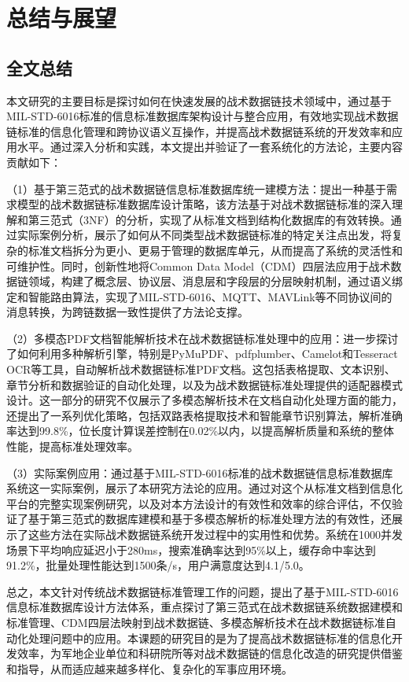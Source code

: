 \chapter{总结与展望}

\section{全文总结}

本文研究的主要目标是探讨如何在快速发展的战术数据链技术领域中，通过基于MIL-STD-6016标准的信息标准数据库架构设计与整合应用，有效地实现战术数据链标准的信息化管理和跨协议语义互操作，并提高战术数据链系统的开发效率和应用水平。通过深入分析和实践，本文提出并验证了一套系统化的方法论，主要内容贡献如下：

（1）基于第三范式的战术数据链信息标准数据库统一建模方法：提出一种基于需求模型的战术数据链标准数据库设计策略，该方法基于对战术数据链标准的深入理解和第三范式（3NF）的分析，实现了从标准文档到结构化数据库的有效转换。通过实际案例分析，展示了如何从不同类型战术数据链标准的特定关注点出发，将复杂的标准文档拆分为更小、更易于管理的数据库单元，从而提高了系统的灵活性和可维护性。同时，创新性地将Common Data Model（CDM）四层法应用于战术数据链领域，构建了概念层、协议层、消息层和字段层的分层映射机制，通过语义绑定和智能路由算法，实现了MIL-STD-6016、MQTT、MAVLink等不同协议间的消息转换，为跨链数据一致性提供了方法论支撑。

（2）多模态PDF文档智能解析技术在战术数据链标准处理中的应用：进一步探讨了如何利用多种解析引擎，特别是PyMuPDF、pdfplumber、Camelot和Tesseract OCR等工具，自动解析战术数据链标准PDF文档。这包括表格提取、文本识别、章节分析和数据验证的自动化处理，以及为战术数据链标准处理提供的适配器模式设计。这一部分的研究不仅展示了多模态解析技术在文档自动化处理方面的能力，还提出了一系列优化策略，包括双路表格提取技术和智能章节识别算法，解析准确率达到99.8\%，位长度计算误差控制在0.02\%以内，以提高解析质量和系统的整体性能，提高标准处理效率。

（3）实际案例应用：通过基于MIL-STD-6016标准的战术数据链信息标准数据库系统这一实际案例，展示了本研究方法论的应用。通过对这个从标准文档到信息化平台的完整实现案例研究，以及对本方法设计的有效性和效率的综合评估，不仅验证了基于第三范式的数据库建模和基于多模态解析的标准处理方法的有效性，还展示了这些方法在实际战术数据链系统开发过程中的实用性和优势。系统在1000并发场景下平均响应延迟小于280ms，搜索准确率达到95\%以上，缓存命中率达到91.2\%，批量处理性能达到1500条/s，用户满意度达到4.1/5.0。

总之，本文针对传统战术数据链标准管理工作的问题，提出了基于MIL-STD-6016信息标准数据库设计方法体系，重点探讨了第三范式在战术数据链系统数据建模和标准管理、CDM四层法映射到战术数据链、多模态解析技术在战术数据链标准自动化处理问题中的应用。本课题的研究目的是为了提高战术数据链标准的信息化开发效率，为军地企业单位和科研院所等对战术数据链的信息化改造的研究提供借鉴和指导，从而适应越来越多样化、复杂化的军事应用环境。

